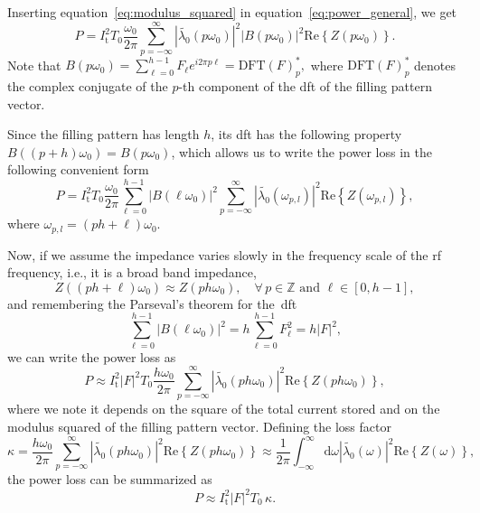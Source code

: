 \documentclass[a4paper,
               biblatex,     %
               ]{jacow}
\providecommand{\der}{\mathrm{d}}
\providecommand{\Real}[1]{\ensuremath{\mathrm{Re}\left\{#1\right\}}}
\begin{document}
    Inserting equation~\eqref{eq:modulus_squared} in equation~\eqref{eq:power_general}, we get
    \begin{equation}
        P = I_\mathrm{t}^2T_0 \frac{\omega_0}{2\pi}\sum_{p=-\infty}^{\infty} \left|\tilde{\lambda_0}(p\omega_0)\right|^2 \left|B(p\omega_0)\right|^2\Real{Z(p\omega_0)}.
    \end{equation}
    Note that
    $
        B(p\omega_0) = \sum_{\ell=0}^{h-1}F_\ell e^{i2\pi p\ell} = \mathrm{DFT}(F)^*_p,
    $
    where $\mathrm{DFT}(F)^*_p$ denotes the complex conjugate of the $p$-th component of the \gls{dft} of the filling pattern vector.
    
    Since the filling pattern has length $h$, its \gls{dft} has the following property
    $
        B((p+h)\omega_0) = B(p\omega_0)
    $,
    which allows us to write the power loss in the following convenient form
    \begin{equation}
        P = I_\mathrm{t}^2T_0 \frac{\omega_0}{2\pi}\sum_{\ell=0}^{h-1} \left|B(\ell\omega_0)\right|^2\sum_{p=-\infty}^{\infty} \left|\tilde{\lambda_0}(\omega_{p,l})\right|^2 \Real{Z(\omega_{p,l})},
    \end{equation}
    where $\omega_{p,l} = (ph+\ell)\omega_0$.
    
    Now, if we assume the impedance varies slowly in the frequency scale of the rf frequency, i.e., it is a broad band impedance,
    \begin{equation}
        Z((ph+\ell)\omega_0) \approx Z(ph\omega_0), \quad \forall\, p \in\mathbb{Z}\,\,\mathrm{and}\,\, \ell \in[0,h-1],
    \end{equation}
    and remembering the Parseval's theorem for the~\gls{dft}~\cite{Wikipedia_DFT}
    \begin{equation}
        \sum_{\ell=0}^{h-1} \left|B(\ell\omega_0)\right|^2 = h\sum_{\ell=0}^{h-1} F_\ell^2 = h|F|^2,
    \end{equation}
    we can write the power loss as
    \begin{equation}
        P \approx I_\mathrm{t}^2 \left|F\right|^2 T_0 \frac{h\omega_0}{2\pi}\sum_{p=-\infty}^{\infty} \left|\tilde{\lambda_0}(ph\omega_0)\right|^2 \Real{Z(ph\omega_0)},
    \end{equation}
    where we note it depends on the square of the total current stored and on the modulus squared of the filling pattern vector. Defining the loss factor
    \begin{equation}
        \kappa = \frac{h\omega_0}{2\pi}\sum_{p=-\infty}^{\infty} \left|\tilde{\lambda_0}(ph\omega_0)\right|^2 \Real{Z(ph\omega_0)}\approx \frac{1}{2\pi}\int_{-\infty}^{\infty} \der\omega \left|\tilde{\lambda_0}(\omega)\right|^2 \Real{Z(\omega)},
    \end{equation}
    the power loss can be summarized as
    \begin{equation}\label{eq:power_broadband}
        P \approx I_\mathrm{t}^2 \left|F\right|^2 T_0\, \kappa.
    \end{equation}
    
\end{document}
